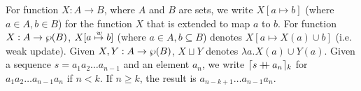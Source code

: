 For function $X: A \to B$, where $A$ and $B$ are sets, we write $X[a
\mapsto b]$ %
(where $a \in A, b \in B$)
for the function $X$ that is extended to map  $a$ to $b$.
For function $X: A \to \wp(B)$,
$X[ a \stackrel {{\it w}}{\mapsto} b]$ 
(where $a \in A, b \subseteq B$)
denotes $X[ a\mapsto X(a) \cup b]$ (i.e. weak update).
Given $X, Y: A \to \wp(B)$, $X \sqcup Y$ denotes $\lambda
a. X(a) \cup Y(a)$. Given a sequence $s = a_1a_2\dots a_{n-1}$ and an element
$a_n$, we write ${\lceil s \mathbin{{+}\mspace{-8mu}{+}} a_n \rceil_{k}}$ for $a_1a_2\dots a_{n-1}a_n$
if $n < k$. If $n \ge k$, the result is $a_{n-k+1} \dots a_{n-1}a_n$.


